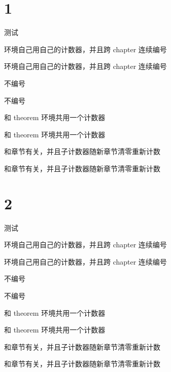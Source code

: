 \documentclass{CCNUthesis}
\begin{document}
\chapter{1}

\begin{theorem}
  测试
\end{theorem}

\begin{test}
  环境自己用自己的计数器，并且跨 chapter 连续编号
\end{test}

\begin{test}
  环境自己用自己的计数器，并且跨 chapter 连续编号
\end{test}

\begin{testt}
  不编号
\end{testt}

\begin{testt}
  不编号
\end{testt}

\begin{testtt}
  和 theorem 环境共用一个计数器
\end{testtt}

\begin{testtt}
  和 theorem 环境共用一个计数器
\end{testtt}

\begin{testttt}
  和章节有关，并且子计数器随新章节清零重新计数
\end{testttt}

\begin{testttt}
  和章节有关，并且子计数器随新章节清零重新计数
\end{testttt}


\chapter{2}

\begin{theorem}
  测试
\end{theorem}

\begin{test}
  环境自己用自己的计数器，并且跨 chapter 连续编号
\end{test}

\begin{test}
  环境自己用自己的计数器，并且跨 chapter 连续编号
\end{test}

\begin{testt}
  不编号
\end{testt}

\begin{testt}
  不编号
\end{testt}

\begin{testtt}
  和 theorem 环境共用一个计数器
\end{testtt}

\begin{testtt}
  和 theorem 环境共用一个计数器
\end{testtt}

\begin{testttt}
  和章节有关，并且子计数器随新章节清零重新计数
\end{testttt}

\begin{testttt}
  和章节有关，并且子计数器随新章节清零重新计数
\end{testttt}
\end{document}
